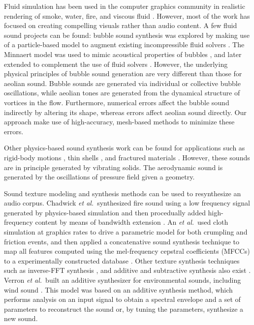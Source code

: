 \documentclass[tog]{acmsiggraph}
\def\etal{\emph{et al.}}
\begin{document}
Fluid simulation has been used in the computer graphics community in realistic rendering of smoke, water, fire, and viscous fluid \cite{bridson_book}. However, most of the work has focused on creating compelling visuals rather than audio content. A few fluid sound projects can be found: bubble sound synthesis was explored by making use of a particle-based model to augment existing incompressible fluid solvers \cite{zheng2009}. The Minnaert model was used to mimic acoustical properties of bubbles \cite{vandenDoel2005}, and later extended to complement the use of fluid solvers \cite{moss2010}. However, the underlying physical principles of bubble sound generation are very different than those for aeolian sound. Bubble sounds are generated via individual or collective bubble oscillations, while aeolian tones are generated from the dynamical structure of vortices in the flow. Furthermore, numerical errors affect the bubble sound indirectly by altering its shape, whereas errors affect aeolian sound directly. Our approach make use of high-accuracy, mesh-based methods to minimize these errors.

Other physics-based sound synthesis work can be found for applications such as rigid-body motions \cite{obrien2002,vandenDoel2001}, thin shells \cite{chadwick2009}, and fractured materials \cite{zheng2010,chadwick2012}. However, these sounds are in principle generated by vibrating solids. The aerodynamic sound is generated by the oscillations of pressure field given a geometry. 

Sound texture modeling and synthesis methods can be used to resynthesize an audio corpus. Chadwick \etal~synthesized fire sound using a low frequency signal generated by physics-based simulation and then procedually added high-frequency content by means of bandwidth extension \cite{chadwick2011}. An \etal~used cloth simulation at graphics rates to drive a parametric model for both crumpling and friction events, and then applied a concatenative sound synthesis technique to map all features computed using the mel-frequency cepstral coefficients (MFCCs) to a experimentally constructed database \cite{an2012}. Other texture synthesis techniques such as inverse-FFT synthesis \cite{rodet1992}, and additive and subtractive synthesis also exist \cite{serra1990}. Verron \etal~built an additive synthesizer for environmental sounds, including wind sound \cite{verronphd}. This model was based on an additive synthesis method, which performs analysis on an input signal to obtain a spectral envelope and a set of parameters to reconstruct the sound or, by tuning the parameters, synthesize a new sound. 
\end{document}
